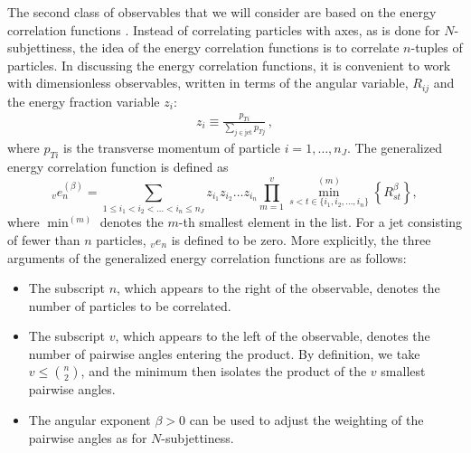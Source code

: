 \documentclass[11pt]{cernrep}
\begin{document}
The second class of observables that we will consider are based on the energy correlation functions \cite{Larkoski:2013eya,Moult:2016cvt}.
%
Instead of correlating particles with axes, as is done for $N$-subjettiness, the idea of the energy correlation functions is to correlate $n$-tuples of particles.
%
In discussing the energy correlation functions, it is convenient to
work with dimensionless observables, written in terms of the angular
variable, $R_{ij}$ and the energy fraction variable $z_i$:
\begin{align}\label{jetsub_2prong_eq:ptratio}  
z_i\equiv\frac{p_{Ti}}{\sum_{j \in \text{jet}} p_{Tj}}\,,
\end{align}
where $p_{Ti}$ is the transverse momentum of particle $i=1,\dots,n_J$. 
%
%
The generalized energy correlation function is defined as
\begin{equation}\label{jetsub_2prong_eq:ecf_gen}
_v e_n^{(\beta)} = \sum_{1 \leq i_1 < i_2 < \dots < i_n \leq n_J} z_{i_1} z_{i_2} \dots z_{i_n} \prod_{m = 1}^{v} \min^{(m)}_{s < t \in \{i_1, i_2 , \dots, i_n \}} \left\{ R_{st}^{\beta} \right\},
\end{equation}
where $\min^{(m)}$ denotes the $m$-th smallest element in the list.  For a jet consisting of fewer than $n$ particles, $_v e_n$ is defined to be zero.  More explicitly, the three arguments of the generalized energy correlation functions are as follows:
\begin{itemize}
\item The subscript $n$, which appears to the right of the observable, denotes the number of particles to be correlated.   
\item The subscript $v$, which appears to the left of the observable, denotes the number of pairwise angles entering the product.  By definition, we take $v \leq \binom{n}{2}$, and the minimum then isolates the product of the $v$ smallest pairwise angles.
\item The angular exponent $\beta>0$ can be used to adjust the
  weighting of the pairwise angles as for $N$-subjettiness.
\end{itemize}
\end{document}

